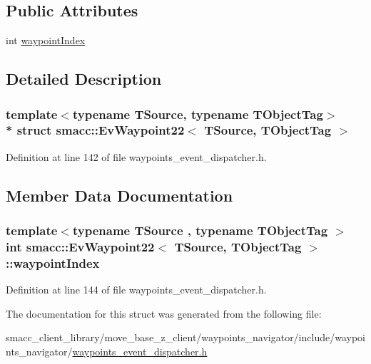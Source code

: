 \subsection*{Public Attributes}
\begin{DoxyCompactItemize}
\item 
int \hyperlink{structsmacc_1_1EvWaypoint22_a01ebf185af1d9ed33c72d00d8f36e510}{waypoint\+Index}
\end{DoxyCompactItemize}


\subsection{Detailed Description}
\subsubsection*{template$<$typename T\+Source, typename T\+Object\+Tag$>$\\*
struct smacc\+::\+Ev\+Waypoint22$<$ T\+Source, T\+Object\+Tag $>$}



Definition at line 142 of file waypoints\+\_\+event\+\_\+dispatcher.\+h.



\subsection{Member Data Documentation}
\subsubsection[{\texorpdfstring{waypoint\+Index}{waypointIndex}}]{\setlength{\rightskip}{0pt plus 5cm}template$<$typename T\+Source , typename T\+Object\+Tag $>$ int {\bf smacc\+::\+Ev\+Waypoint22}$<$ T\+Source, T\+Object\+Tag $>$\+::waypoint\+Index}\hypertarget{structsmacc_1_1EvWaypoint22_a01ebf185af1d9ed33c72d00d8f36e510}{}\label{structsmacc_1_1EvWaypoint22_a01ebf185af1d9ed33c72d00d8f36e510}


Definition at line 144 of file waypoints\+\_\+event\+\_\+dispatcher.\+h.



The documentation for this struct was generated from the following file\+:\begin{DoxyCompactItemize}
\item 
smacc\+\_\+client\+\_\+library/move\+\_\+base\+\_\+z\+\_\+client/waypoints\+\_\+navigator/include/waypoints\+\_\+navigator/\hyperlink{waypoints__event__dispatcher_8h}{waypoints\+\_\+event\+\_\+dispatcher.\+h}\end{DoxyCompactItemize}
